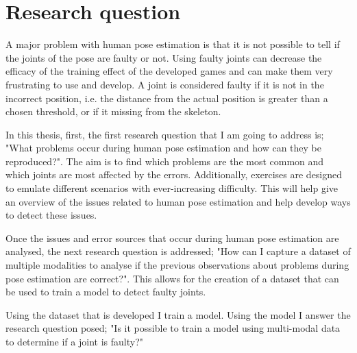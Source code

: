 \section{Research question}

A major problem with human pose estimation is that it is not possible to tell if the joints of the pose are faulty or not. Using faulty joints can decrease the efficacy of the training effect of the developed games and can make them very frustrating to use and develop. A joint is considered faulty if it is not in the incorrect position, i.e. the distance from the actual position is greater than a chosen threshold, or if it missing from the skeleton.

In this thesis, first, the first research question that I am going to address is; "What problems occur during human pose estimation and how can they be reproduced?". The aim is to find which problems are the most common and which joints are most affected by the errors. Additionally, exercises are designed to emulate different scenarios with ever-increasing difficulty. This will help give an overview of the issues related to human pose estimation and help develop ways to detect these issues. 

Once the issues and error sources that occur during human pose estimation are analysed, the next research question is addressed; "How can I capture a dataset of multiple modalities to analyse if the previous observations about problems during pose estimation are correct?". This allows for the creation of a dataset that can be used to train a model to detect faulty joints.

Using the dataset that is developed I train a model. Using the model I answer the research question posed; "Is it possible to train a model using multi-modal data to determine if a joint is faulty?"